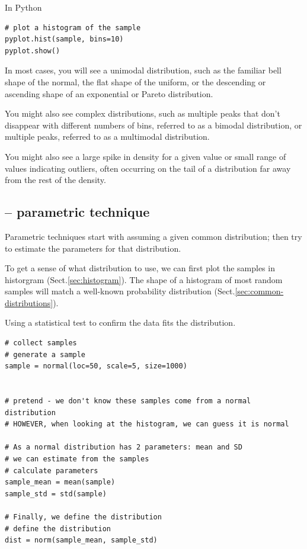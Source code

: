 In Python
\begin{lstlisting}
# plot a histogram of the sample
pyplot.hist(sample, bins=10)
pyplot.show()
\end{lstlisting}

In most cases, you will see a unimodal distribution, such as the familiar bell
shape of the normal, the flat shape of the uniform, or the descending or
ascending shape of an exponential or Pareto distribution.

You might also see complex distributions, such as multiple peaks that don’t
disappear with different numbers of bins, referred to as a bimodal distribution,
or multiple peaks, referred to as a multimodal distribution.

You might also see a large spike in density for a given value or small range of
values indicating outliers, often occurring on the tail of a distribution far
away from the rest of the density.

\subsection{-- parametric technique}
\label{sec:pdf-estimate-parametric}

Parametric techniques start with assuming a given common distribution; then try
to estimate the parameters for that distribution.

To get a sense of what distribution to use, we can first plot the samples in
historgram (Sect.\ref{sec:histogram}).  The shape of a histogram of most random
samples will match a well-known probability distribution
(Sect.\ref{sec:common-distributions}). 

Using a statistical test to confirm the data fits the distribution.

\begin{lstlisting}
# collect samples
# generate a sample 
sample = normal(loc=50, scale=5, size=1000)


# pretend - we don't know these samples come from a normal distribution
# HOWEVER, when looking at the histogram, we can guess it is normal

# As a normal distribution has 2 parameters: mean and SD
# we can estimate from the samples
# calculate parameters
sample_mean = mean(sample)
sample_std = std(sample)

# Finally, we define the distribution
# define the distribution
dist = norm(sample_mean, sample_std)
\end{lstlisting}

